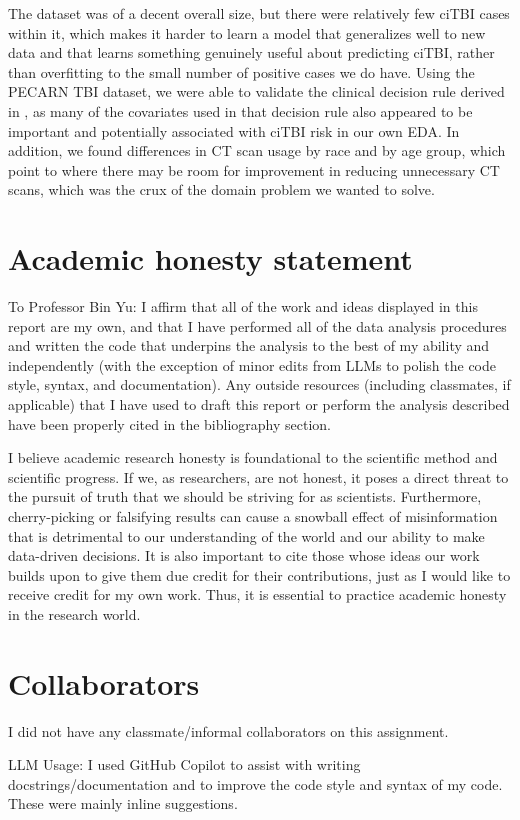 \documentclass[10pt,letterpaper]{article}
\begin{document}
The dataset was of a decent overall size, but there were relatively few ciTBI cases within it, which makes it harder to learn a model that generalizes well to new data and that learns something genuinely useful about predicting ciTBI, rather than overfitting to the small number of positive cases we do have.
Using the PECARN TBI dataset, we were able to validate the clinical decision rule derived in \cite{Kuppermann2009}, as many of the covariates used in that decision rule also appeared to be important and potentially associated with ciTBI risk in our own EDA. In addition, we found differences in CT scan usage by race and by age group,
which point to where there may be room for improvement in reducing unnecessary CT scans, which was the crux of the domain problem we wanted to solve.


\section{Academic honesty statement}\label{academic-honesty-statement}
To Professor Bin Yu: I affirm that all of the work and ideas displayed in this report are my own, and that I have performed all of the data analysis
procedures and written the code that underpins the analysis to the best of my ability and independently (with the exception of minor edits from LLMs to polish the code style, syntax, and documentation).
Any outside resources (including classmates, if applicable) that I have used to draft this report or perform the analysis described have been properly cited in the bibliography section.

I believe academic research honesty is foundational to the scientific method and scientific progress. If we, as researchers, are not honest, it poses a direct
threat to the pursuit of truth that we should be striving for as scientists. Furthermore, cherry-picking or falsifying results can cause a snowball effect of misinformation
that is detrimental to our understanding of the world and our ability to make data-driven decisions. It is also important to cite those whose ideas our work builds upon to give them
due credit for their contributions, just as I would like to receive credit for my own work. Thus, it is essential to practice academic honesty in the research world.


\section{Collaborators}\label{collaborators}
I did not have any classmate/informal collaborators on this assignment.

LLM Usage: I used GitHub Copilot to assist with writing docstrings/documentation and to improve the code style and syntax of my code. These were
mainly inline suggestions.




\end{document}
